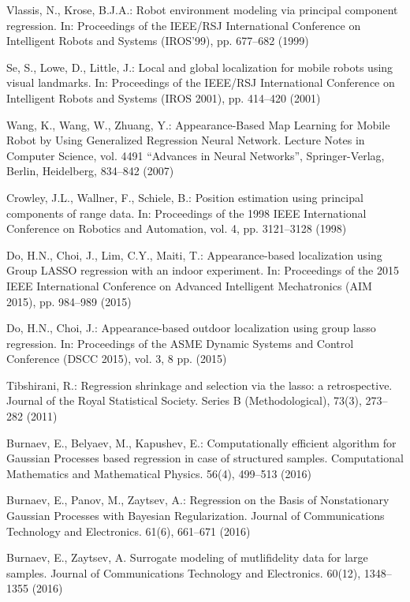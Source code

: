 \documentclass[conference]{IEEEtran} %
\begin{document}
\begin{thebibliography}{100}
Vlassis, N., Krose, B.J.A.: Robot environment modeling via principal component regression. In: Proceedings of the IEEE/RSJ International Conference on Intelligent Robots and Systems (IROS'99), pp. 677--682 (1999)

Se, S., Lowe, D., Little, J.: Local and global localization for mobile robots using visual landmarks. In: Proceedings of the IEEE/RSJ International Conference on Intelligent Robots and Systems (IROS 2001), pp. 414--420 (2001)

Wang, K., Wang, W., Zhuang, Y.: Appearance-Based Map Learning for Mobile Robot by Using Generalized Regression Neural Network. Lecture Notes in Computer Science, vol. 4491 ``Advances in Neural Networks'', Springer-Verlag, Berlin, Heidelberg, 834--842 (2007)

Crowley, J.L., Wallner, F., Schiele, B.: Position estimation using principal components of range data. In: Proceedings of the 1998 IEEE International Conference on Robotics and Automation, vol. 4, pp. 3121--3128 (1998)

Do, H.N., Choi, J., Lim, C.Y., Maiti, T.: Appearance-based localization using Group LASSO regression with an indoor experiment. In: Proceedings of the 2015 IEEE International Conference on Advanced Intelligent Mechatronics (AIM 2015), pp. 984--989 (2015)

Do, H.N., Choi, J.: Appearance-based outdoor localization using group lasso regression. In: Proceedings of the ASME Dynamic Systems and Control Conference (DSCC 2015), vol. 3, 8 pp. (2015)

Tibshirani, R.: Regression shrinkage and selection via the lasso: a retrospective. Journal of the Royal Statistical Society. Series B (Methodological), 73(3), 273--282 (2011)

Burnaev, E., Belyaev, M., Kapushev, E.: Computationally efficient algorithm for Gaussian Processes based regression in case of structured samples. Computational Mathematics and Mathematical Physics. 56(4), 499--513 (2016)

Burnaev, E., Panov, M., Zaytsev, A.: Regression on the Basis of Nonstationary Gaussian Processes with Bayesian Regularization. Journal of Communications Technology and Electronics. 61(6), 661--671 (2016)

Burnaev, E., Zaytsev, A. Surrogate modeling of mutlifidelity data for large samples. Journal of Communications Technology and Electronics. 60(12), 1348--1355 (2016)


\end{thebibliography}
\end{document}
